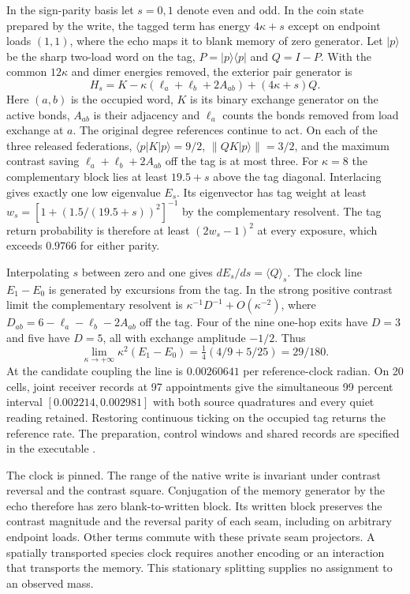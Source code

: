 In the sign-parity basis let $s=0,1$ denote even and odd. In the coin state
prepared by the write, the tagged term has energy $4\kappa+s$ except on
endpoint loads $(1,1)$, where the echo maps it to blank memory of zero
generator. Let $|p\rangle$ be the sharp two-load word on the tag,
$P=|p\rangle\langle p|$ and $Q=I-P$.
With the common $12\kappa$ and dimer energies removed, the exterior pair
generator is
\[
 H_s=K-\kappa(\ell_a+\ell_b+2A_{ab})+(4\kappa+s)Q .
\]
Here $(a,b)$ is the occupied word, $K$ is its binary exchange generator
on the active bonds, $A_{ab}$ is their adjacency and $\ell_a$ counts the
bonds removed from load exchange at $a$. The original degree references
continue to act. On each of the three released federations,
$\langle p|K|p\rangle=9/2$, $\|QK|p\rangle\|=3/2$, and the maximum contrast saving
$\ell_a+\ell_b+2A_{ab}$ off the tag is at most three.
For $\kappa=8$ the complementary block lies at least $19.5+s$ above the
tag diagonal. Interlacing gives exactly one low eigenvalue $E_s$.
Its eigenvector has tag weight at least
$w_s=[1+(1.5/(19.5+s))^2]^{-1}$ by the complementary resolvent.
The tag return probability is therefore at least $(2w_s-1)^2$ at every
exposure, which exceeds $0.9766$ for either parity.

Interpolating $s$ between zero and one gives
$dE_s/ds=\langle Q\rangle_s$. The clock line $E_1-E_0$ is generated by
excursions from the tag. In the strong positive contrast limit the
complementary resolvent is $\kappa^{-1}D^{-1}+O(\kappa^{-2})$, where
$D_{ab}=6-\ell_a-\ell_b-2A_{ab}$ off the tag. Four of the nine one-hop
exits have $D=3$ and five have $D=5$, all with exchange amplitude $-1/2$.
Thus
\[
 \lim_{\kappa\to+\infty}\kappa^2(E_1-E_0)
 =\tfrac14(4/9+5/25)=29/180 .
\]
At the candidate coupling the line is $0.00260641$ per reference-clock
radian. On 20 cells, joint receiver records at 97 appointments give the
simultaneous 99 percent interval $[0.002214,0.002981]$ with both source
quadratures and every quiet reading retained. Restoring continuous ticking
on the occupied tag returns the reference rate. The preparation, control
windows and shared records are specified in the executable
.

The clock is pinned. The range of the native write is invariant under
contrast reversal and the contrast square. Conjugation of the memory
generator by the echo therefore has zero blank-to-written block. Its
written block preserves the contrast magnitude and the reversal parity of
each seam, including on arbitrary endpoint loads. Other terms commute with
these private seam projectors. A spatially transported species clock
requires another encoding or an interaction that transports the memory.
This stationary splitting supplies no assignment to an observed mass.

